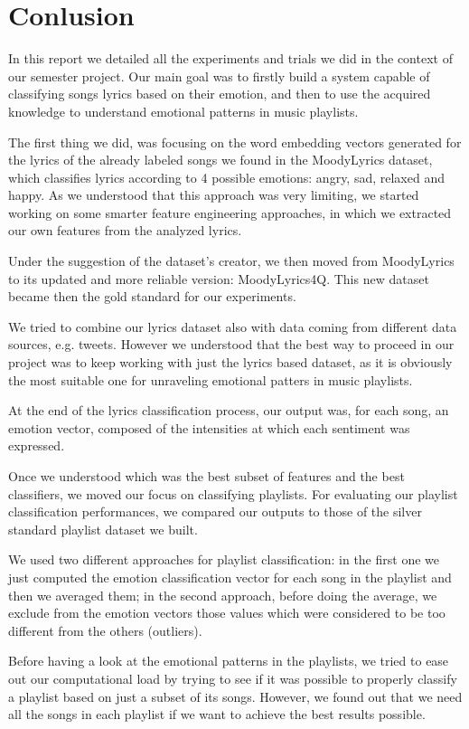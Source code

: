 \chapter{Conlusion}

In this report we detailed all the experiments and trials we did in the context
of our semester project. Our main goal was to firstly build a system capable of
classifying songs lyrics based on their emotion, and then to use the acquired knowledge 
to understand emotional patterns in music playlists.

The first thing we did, was focusing on the word embedding vectors generated for the lyrics
of the already labeled songs we found in the MoodyLyrics dataset, which classifies lyrics according to 
4 possible emotions: angry, sad, relaxed and happy. As we understood that this
approach was very limiting, we started working on some smarter feature engineering approaches,
in which we extracted our own features from the analyzed lyrics.

Under the suggestion of the dataset's creator, we then moved from MoodyLyrics to its updated and more
reliable version: MoodyLyrics4Q. This new dataset became then the gold standard for our experiments.

We tried to combine our lyrics dataset also with data coming from different data sources, e.g. tweets. However
we understood that the best way to proceed in our project was to keep working with just the lyrics
based dataset, as it is obviously the most suitable one for unraveling emotional patters in music playlists.

At the end of the lyrics classification process, our output was, for each song, an emotion vector, composed 
of the intensities at which each sentiment was expressed.

Once we understood which was the best subset of features and the best classifiers, we moved our focus on
classifying playlists. For evaluating our playlist classification performances, we compared our outputs
to those of the silver standard playlist dataset we built.

We used two different approaches for playlist classification: in the first one we
just computed the emotion classification vector for each song in the playlist and then we averaged them;
in the second approach, before doing the average, we exclude from the emotion vectors those values which 
were considered to be too different from the others (outliers).

Before having a look at the emotional patterns in the playlists, we tried to ease out our computational
load by trying to see if it was possible to properly classify a playlist based on just a subset of its songs.
However, we found out that we need all the songs in each playlist if we want to achieve the best results possible.

